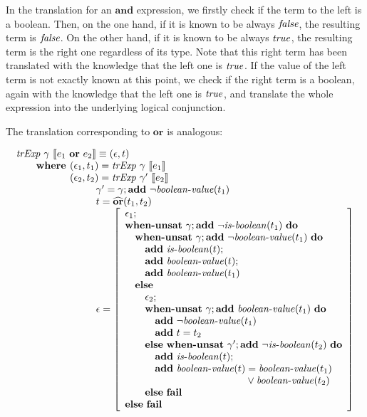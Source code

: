 In the translation for an $\mathbf{and}$ expression, we firstly check if 
the term to the left is a boolean. Then, on the one hand, if it is known to be always 
$\mathit{false}$, the resulting term is $\mathit{false}$. On the other hand, if it 
is known to be always $\mathit{true}$, the resulting term is the right one 
regardless of its type. Note that this right term has been translated with the 
knowledge that the left one is $\mathit{true}$. If the value of the 
left term is not exactly known at this point, we check if the right term 
is a boolean, again with the knowledge that the left one is $\mathit{true}$,
and translate the whole expression into the underlying logical conjunction.

The translation corresponding to $\mathbf{or}$ is analogous:

\[
\begin{array}{l}
\trExp{\gamma}{\orE{e_1}{e_2}} \equiv (\epsilon, t)\\
\qquad \textbf{where }(\epsilon_1, t_1) = \trExp{\gamma}{e_1}\\
\qquad \phantom{\textbf{where }}(\epsilon_2, t_2) = \trExp{\gamma'}{e_2}\\
\qquad\qquad\qquad\qquad \gamma' = \gamma;\addE~\neg\booleanvalue{t_1}\\
\qquad\qquad\qquad\qquad t = \widehat{\mathbf{or}}(t_1, t_2)\\
\qquad\qquad\qquad\qquad \epsilon = \left[ 
\begin{array}{l}
\epsilon_1;\\
\whenUnsatW~\gamma;\addE~\neg\isboolean{t_1}~\doW\\
\quad\whenUnsatW~\gamma;\addE~\neg\booleanvalue{t_1}~\doW\\
\quad\quad\addE~\isboolean{t};\\
\quad\quad\addE~\booleanvalue{t};\\
\quad\quad\addE~\booleanvalue{t_1}\\
\quad\elseW\\
\quad\quad\epsilon_2;\\
\quad\quad\whenUnsatW~\gamma;\addE~\booleanvalue{t_1}~\doW\\
\quad\quad\quad\addE~\neg\booleanvalue{t_1}\\
\quad\quad\quad\addE~t = t_2\\
\quad\quad\elseW~\whenUnsatW~\gamma';\addE~\neg\isboolean{t_2}~\doW\\
\quad\quad\quad\addE~\isboolean{t};\\
\quad\quad\quad\addE~\booleanvalue{t} = \booleanvalue{t_1} \\
\quad\phantom{\quad\quad\addE~\booleanvalue{t}} \lor \booleanvalue{t_2}\\
\quad\quad\elseW~\failE\\
\elseW~\failE
\end{array}
\right] \\
\end{array}
\]

